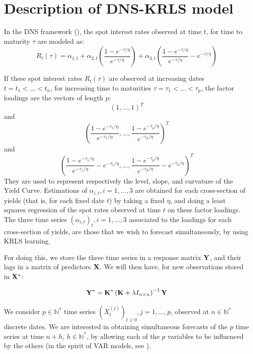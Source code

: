 \section{Description of DNS-KRLS model}
\label{sec:dnskrls}

In the DNS framework (\cite{diebold2006forecasting}), the spot interest rates observed at time $t$, for time to maturity $\tau$ are modeled as:
\begin{equation}
R_t(\tau) = \alpha_{1, t} + \alpha_{2, t}\left(\frac{1-e^{-\tau/\eta}}{e^{-\tau/\eta}}\right) + \alpha_{3, t}\left(\frac{1-e^{-\tau/\eta}}{e^{-\tau/\eta}} - e^{-\tau/\eta}\right)
\end{equation}

\medskip

If these spot interest rates $R_t(\tau)$ are observed at increasing dates $t = t_1 < \ldots < t_n$, for increasing time to maturities $\tau = \tau_1 < \ldots < \tau_p$, the factor loadings are the vectors of length $p$:  
$$
(1, \ldots, 1)^T
$$
and
$$
\left(\frac{1-e^{-\tau_1/\eta}}{e^{-\tau_1/\eta}}, \ldots, \frac{1-e^{-\tau_p/\eta}}{e^{-\tau_p/\eta}}\right)^T
$$ 
and 
$$
\left(\frac{1-e^{-\tau_1/\eta}}{e^{-\tau_1/\eta}} - e^{-\tau_1/\eta}, \ldots, \frac{1-e^{-\tau_p/\eta}}{e^{-\tau_p/\eta}} - e^{-\tau_p/\eta}\right)^T
$$ 
They are used to represent respectively the level, slope, and curvature of the Yield Curve. Estimations of $\alpha_{i, t}, i = 1, \ldots, 3$ are obtained for each cross-section of yields (that is, for each fixed date $t$) by taking a fixed $\eta$, and doing a least squares regression of the spot rates observed at time $t$ on these factor loadings. The three time series $(\alpha_{i, t})_t, i = 1, \ldots, 3$ associated to the loadings for each cross-section of yields, are those that we wish to forecast simultaneously, by using KRLS learning.

\medskip

 For doing this, we store the three time series in a response matrix ${\bf Y}$, and their lags in a matrix of predictors ${\bf X}$. We will then have, for new observations stored in ${\bf X}^*$:

 $$
 {\bf Y}^* = {\bf K^*} \left( {\bf K} + \lambda I_{n \times n} \right)^{-1} {\bf Y}
 $$
 
 We consider $p \in \mathbb{N}^*$ time series $(X_t^{(j)})_{t \geq 0}, j = 1, \ldots, p$,
observed at $n \in \mathbb{N}^*$ discrete dates. We are interested in
obtaining simultaneous forecasts of the $p$ time series at time $n+h$, $h \in
\mathbb{N}^*$, by allowing each of the $p$ variables to be influenced by the
others (in the spirit of VAR models, see \cite{lutkepohl2005new}).

